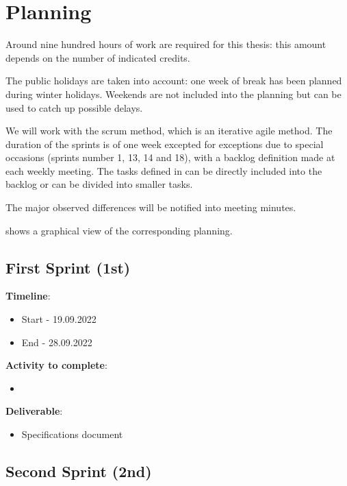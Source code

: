 \chapter{Planning}
\label{chap:planning}

Around nine hundred hours of work are required for this thesis: this amount depends on the number of indicated credits.

The public holidays are taken into account: one week of break has been planned during winter holidays. Weekends are not included into the planning but can be used to catch up possible delays.

We will work with the \gls{scrum} method, which is an iterative agile method. The duration of the sprints is of one week excepted for exceptions due to special occasions (sprints number 1, 13, 14 and 18), with a backlog definition made at each weekly meeting. The tasks defined in  can be directly included into the backlog or can be divided into smaller tasks.

The major observed differences will be notified into meeting minutes.

 shows a graphical view of the corresponding planning.

\section{First Sprint (1st)}
\label{sec:planning_first}

\textbf{Timeline}:
\begin{itemize}
    \item Start - 19.09.2022
	\item End - 28.09.2022
\end{itemize}

\textbf{Activity to complete}:
\begin{itemize}
    \item {}
\end{itemize}

\textbf{Deliverable}:
\begin{itemize}
    \item Specifications document
\end{itemize}

\section{Second Sprint (2nd)}
\label{sec:planning_second}


